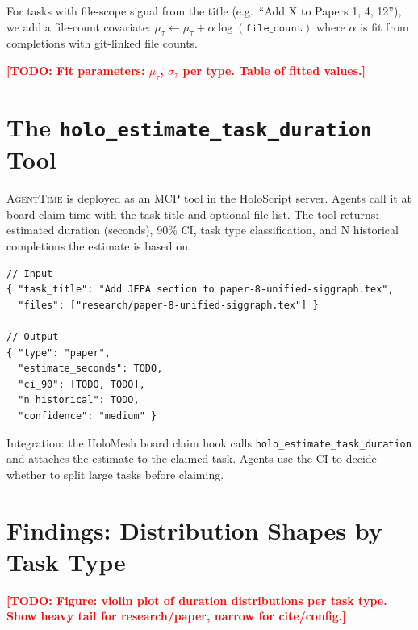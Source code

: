 \documentclass[sigconf]{acmart}
\newcommand{\todo}[1]{\textcolor{red}{\textbf{[TODO: #1]}}}
\newcommand{\holoscript}{HoloScript}
\newcommand{\holomesh}{HoloMesh}
\newcommand{\agenttime}{\textsc{AgentTime}}
\begin{document}
For tasks with file-scope signal from the title (e.g.\ ``Add X to Papers 1, 4, 12''),
we add a file-count covariate:
$\mu_\tau \leftarrow \mu_\tau + \alpha \log(\texttt{file\_count})$
where $\alpha$ is fit from completions with git-linked file counts.

\todo{Fit parameters: $\mu_\tau$, $\sigma_\tau$ per type. Table of fitted values.}

\section{The \texttt{holo\_estimate\_task\_duration} Tool}
\label{sec:tool}

\agenttime{} is deployed as an MCP tool in the \holoscript{} server.
Agents call it at board claim time with the task title and optional
file list.
The tool returns: estimated duration (seconds), 90\% CI, task type
classification, and N historical completions the estimate is based on.

\begin{lstlisting}[caption={Example tool call and response.}]
// Input
{ "task_title": "Add JEPA section to paper-8-unified-siggraph.tex",
  "files": ["research/paper-8-unified-siggraph.tex"] }

// Output
{ "type": "paper",
  "estimate_seconds": TODO,
  "ci_90": [TODO, TODO],
  "n_historical": TODO,
  "confidence": "medium" }
\end{lstlisting}

Integration: the \holomesh{} board claim hook calls
\texttt{holo\_estimate\_task\_duration} and attaches the estimate to
the claimed task. Agents use the CI to decide whether to split large
tasks before claiming.

\section{Findings: Distribution Shapes by Task Type}
\label{sec:findings}

\todo{Figure: violin plot of duration distributions per task type.
      Show heavy tail for research/paper, narrow for cite/config.}
\end{document}
